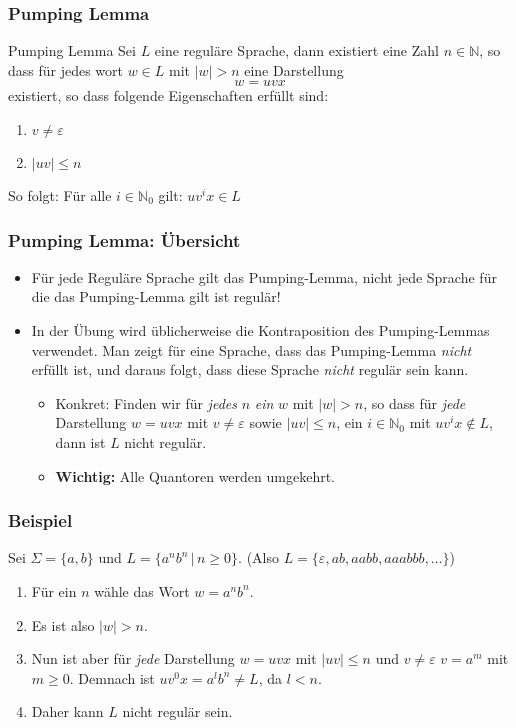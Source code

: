 \documentclass{beamer}
\begin{document}
{%
\begin{frame}
\frametitle{Pumping Lemma}
\begin{exampleblock}{Pumping Lemma}
Sei $L$ eine reguläre Sprache, dann existiert eine Zahl $n \in \mathbb{N}$, so dass für jedes wort $w \in L$ mit $\left|w \right| > n$ eine Darstellung $$w = uvx$$ existiert, so dass folgende Eigenschaften erfüllt sind:

\begin{enumerate}
\item $v \neq \varepsilon$ 
\item $\left|uv\right| \leq n$ 
\end{enumerate}
So folgt: Für alle $i \in \mathbb{N}_0$ gilt: $uv^ix \in L$
\end{exampleblock}
\end{frame}
\begin{frame}
\frametitle{Pumping Lemma: Übersicht}
\begin{itemize}
\item Für jede Reguläre Sprache gilt das Pumping-Lemma, nicht jede Sprache für die das Pumping-Lemma gilt ist regulär!
\item In der Übung wird üblicherweise die Kontraposition des Pumping-Lemmas verwendet. Man zeigt für eine Sprache, dass das Pumping-Lemma \emph{nicht} erfüllt ist, und daraus folgt, dass diese Sprache \emph{nicht} regulär sein kann.
\begin{itemize}
\item Konkret: Finden wir für \emph{jedes} $n$ \emph{ein} $w$ mit $\left|w\right| > n$, so dass für \emph{jede} Darstellung $w = uvx$ mit $v \neq \varepsilon$ sowie $\left|uv\right| \leq n$, ein $i \in \mathbb{N}_0$ mit $uv^ix \notin L$, dann ist $L$ nicht regulär.
\item \textbf{Wichtig:} Alle Quantoren werden umgekehrt.
\end{itemize}
\end{itemize}
\end{frame}

\begin{frame}
\frametitle{Beispiel}
Sei $\Sigma = \{a, b\}$ und $L = \{a^nb^n\,|\,n\geq0\}$. (Also $L = \{\varepsilon,ab, aabb, aaabbb, \ldots\}$)
\begin{enumerate}
\item Für ein $n$ wähle das Wort $w = a^nb^n$.
\item Es ist also $\left|w\right| > n$.
\item Nun ist aber für \emph{jede} Darstellung $w = uvx$ mit $\left|uv\right| \leq n$ und $v \neq \varepsilon$ $v = a^m$ mit $m \geq 0$. Demnach ist $uv^0x = a^lb^n \neq L$, da $l < n$.
\item Daher kann $L$ nicht regulär sein.
\end{enumerate}


\end{frame}}
\end{document}
